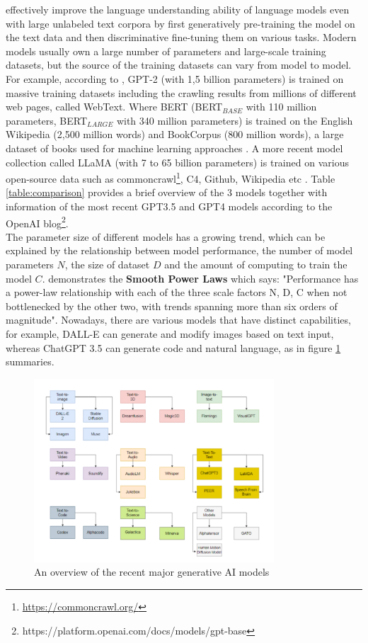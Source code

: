 \documentclass[runningheads]{llncs}
\begin{document}
effectively improve the language understanding ability of language models even with large unlabeled text corpora by first generatively pre-training the model on the text data and then discriminative fine-tuning them on various tasks.
Modern models usually own a large number of parameters and large-scale training datasets, but the source of the training datasets can vary from model to model. For example, 
according to \cite{Radford19}, GPT-2 (with 1,5 billion parameters) is trained on massive training datasets including the crawling results from millions of different web pages, called WebText. Where BERT (BERT$_{BASE}$ with 110 million
parameters, BERT$_{LARGE}$ with 340 million parameters) is trained on the English Wikipedia (2,500 million words) and BookCorpus (800 million words), a large dataset of books used for machine learning approaches \cite{Devlin18}. 
A more recent model collection called LLaMA (with 7 to 65 billion parameters) is trained on various open-source data such as commoncrawl\footnote{\url{https://commoncrawl.org/}}, C4, Github, Wikipedia etc \cite{Touvron23}. 
Table \ref{table:comparison} provides a brief overview of the 3 models together with information of the most recent GPT3.5 and GPT4 models according to the OpenAI blog\footnote{https://platform.openai.com/docs/models/gpt-base}. \\

\noindent
The parameter size of different models has a growing trend, which can be explained by the relationship between model performance, the number of model parameters $N$, the size of dataset $D$ and the amount of computing to train the model $C$. \cite{Kaplan20} demonstrates the \textbf{Smooth Power Laws} which says:
"Performance has a power-law relationship with each of the three scale factors N, D, C when not bottlenecked by the other two, with trends spanning more than six orders of magnitude". Nowadays, there are various models
that have distinct capabilities, for example, DALL-E can generate and modify images based on text input, whereas ChatGPT 3.5 can generate code and natural language, as \cite{Gozalo23} in figure \ref{fig:model_overview} summaries.
\noindent \newline
\begin{figure}[]
  \centering
  \includegraphics[width=0.8\textwidth]{models overview.png}
  \caption{An overview of the recent major generative AI models  \cite{Gozalo23}}
  \label{fig:model_overview}
\end{figure} 
\end{document}
